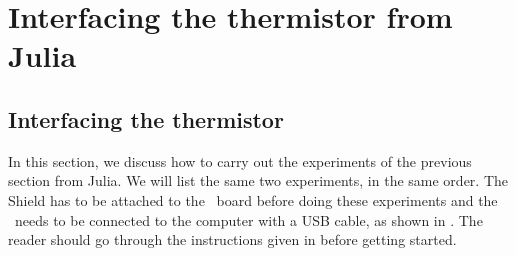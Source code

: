 \section{Interfacing the thermistor from Julia}
\subsection{Interfacing the thermistor}
In this section, we discuss how to carry out the experiments of the
previous section from Julia.  We will list the same two experiments,
in the same order.  The Shield has to be attached to the \arduino\ board
before doing these experiments and the \arduino\ needs to be connected to the computer
with a USB cable, as shown in .
The reader should go through the instructions given in  before getting started.


